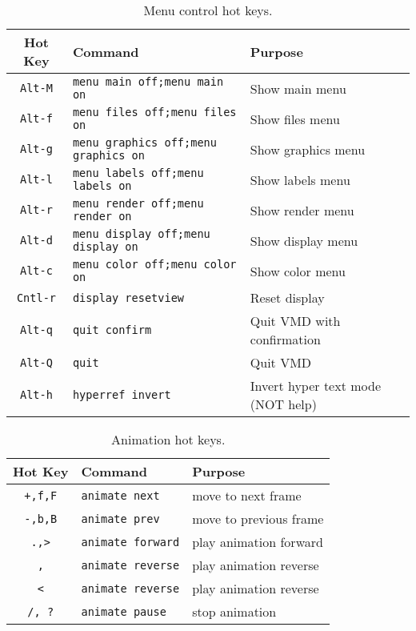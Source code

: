 \begin{table}[htb]
  \hspace{1in}
  \begin{tabular}{|c|l|l|} \hline
    Hot Key & Command &
		Purpose\\ \hline\hline
{\tt Alt-M}	& {\tt menu main off;menu main on}	& Show main menu  \\
{\tt Alt-f}	& {\tt menu files off;menu files on}	& Show files menu \\
{\tt Alt-g}	& {\tt menu graphics off;menu graphics on} & Show graphics menu \\
{\tt Alt-l}	& {\tt menu labels off;menu labels on}	& Show labels menu \\
{\tt Alt-r}	& {\tt menu render off;menu render on} 	& Show render menu \\
{\tt Alt-d}	& {\tt menu display off;menu display on}& Show display menu \\
{\tt Alt-c}	& {\tt menu color off;menu color on} 	& Show color menu \\
{\tt Cntl-r}	& {\tt display resetview}		& Reset display \\
{\tt Alt-q}	& {\tt quit confirm}			& Quit VMD with confirmation \\
{\tt Alt-Q}	& {\tt quit}				& Quit VMD \\
{\tt Alt-h}	& {\tt hyperref invert}			& Invert hyper text mode (NOT help) \\ \hline
  \end{tabular}
  \caption{Menu control hot keys.}
  \label{table:ug:menushortcuts}
\end{table}






\begin{table}[htb]
  \hspace{1in}
  \begin{tabular}{|c|l|l|} \hline
    Hot Key & Command &
		Purpose\\ \hline\hline
	{\tt +,f,F}	& {\tt animate next}	& move to next frame\\
	{\tt -,b,B}	& {\tt animate prev}	& move to previous frame \\
	{\tt .,>}	& {\tt animate forward} & play animation forward \\
	{\tt ,}		& {\tt animate reverse} & play animation reverse \\
	{\tt <}		& {\tt animate reverse}	& play animation reverse \\
	{\tt /, ?}	& {\tt animate pause}	& stop animation \\ \hline
  \end{tabular}
  \caption{Animation hot keys.}
  \label{table:ug:animationhotkeys}
\end{table}


\newpage

